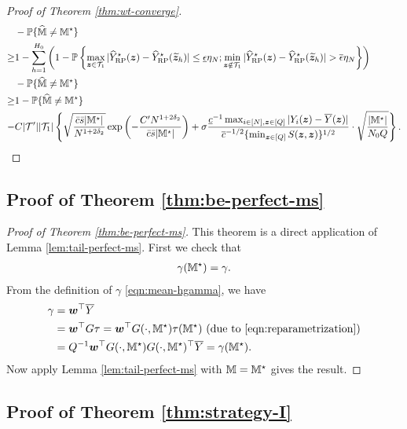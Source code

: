 \documentclass[12pt]{article}
\begin{document}
\begin{proof}[Proof of Theorem \ref{thm:wt-converge}]
\begin{align*}
        &- {\mathbb{P}}\{\widehat{{\mathbb{M}}}\neq {\mathbb{M}}^\star\}\\
        \ge & 1 - \sum_{h=1}^{H_0}\left(1 - {\mathbb{P}}\left\{\max_{{\boldsymbol{z}}\in{\mathcal{T}}_{1}}|{\widehat{Y}}^\star_{\operatorname{RP}}({\boldsymbol{z}})-{\widehat{Y}}^\star_{\operatorname{RP}}(\widetilde{{\boldsymbol{z}}}_h)| \le \underline{\epsilon}\eta_N;  \min_{{\boldsymbol{z}}\notin{\mathcal{T}}_{1}}|{\widehat{Y}}^\star_{\operatorname{RP}}({\boldsymbol{z}})-{\widehat{Y}}^\star_{\operatorname{RP}}(\widetilde{{\boldsymbol{z}}}_h)| > \overline{\epsilon}\eta_N\right\}\right) \\
        & - {\mathbb{P}}\{\widehat{{\mathbb{M}}}\neq {\mathbb{M}}^\star\}\\
        \ge & 1 - {\mathbb{P}}\{\widehat{{\mathbb{M}}}\neq {\mathbb{M}}^\star\} \\
        -&C|{\mathcal{T}}'||{\mathcal{T}}_{1}|\left\{\sqrt{\frac{\bar{c}\bar{s}|{\mathbb{M}}^\star|}{N^{1+2\delta_2}}}\exp\left(-\frac{C'N^{1+2\delta_2}}{\bar{c}\bar{s}|{\mathbb{M}}^\star|}\right)+\sigma   \frac{ \underline{c}^{-1} \max_{i\in[N],{\boldsymbol{z}}\in[Q]}|Y_i({\boldsymbol{z}})-\overline{Y}({\boldsymbol{z}})|}{ {\overline{c}^{-1/2} \{\min_{{\boldsymbol{z}}\in[Q]} S({\boldsymbol{z}},{\boldsymbol{z}})}\}^{1/2}}\cdot \sqrt{\frac{|{\mathbb{M}}^\star|}{N_0Q}}\right\}.
    \end{align*}
    \endgroup


\end{proof}

\subsection{Proof of Theorem \ref{thm:be-perfect-ms}}
{
\begin{proof}[Proof of Theorem \ref{thm:be-perfect-ms}]
This theorem is a direct application of Lemma \ref{lem:tail-perfect-ms}.
First we check that 
\begin{align*}
    \gamma({\mathbb{M}}^\star) = \gamma.
\end{align*}
From the definition of $\gamma$ \eqref{eqn:mean-hgamma}, we have
\begin{align*}
    \gamma &= {\boldsymbol{w}}^\top \overline{Y}\\
    &= {\boldsymbol{w}}^\top G\tau ={\boldsymbol{w}}^\top G(\cdot, {\mathbb{M}}^\star)\tau({\mathbb{M}}^\star) \text{ (due to \eqref{eqn:reparametrization})} \\
    &=Q^{-1}{\boldsymbol{w}}^\top G(\cdot, {\mathbb{M}}^\star)G(\cdot,{\mathbb{M}}^\star)^\top \overline{Y} = \gamma({\mathbb{M}}^\star).
\end{align*}
Now apply Lemma \ref{lem:tail-perfect-ms} with ${\mathbb{M}} = {\mathbb{M}}^\star$ gives the result.  
\end{proof}
}


\subsection{Proof of Theorem \ref{thm:strategy-I}}
\end{document}

